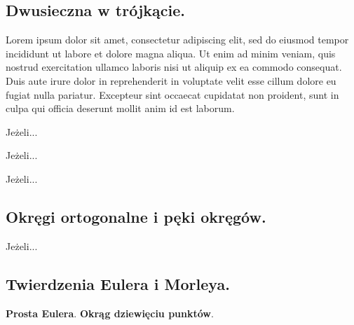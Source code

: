 \documentclass{greaseproof}
\begin{document}
\subsection{Dwusieczna w trójkącie.} Lorem ipsum dolor sit amet, consectetur adipiscing elit, sed do eiusmod tempor incididunt ut labore et dolore magna aliqua. Ut enim ad minim veniam, quis nostrud exercitation ullamco laboris nisi ut aliquip ex ea commodo consequat. Duis aute irure dolor in reprehenderit in voluptate velit esse cillum dolore eu fugiat nulla pariatur. Excepteur sint occaecat cupidatat non proident, sunt in culpa qui officia deserunt mollit anim id est laborum.
\begin{proposition}
	Jeżeli...
\end{proposition}
\begin{theorem}
	Jeżeli...
\end{theorem}
\begin{definition}
	Jeżeli...
\end{definition}

\subsection{Okręgi ortogonalne i pęki okręgów.}
\begin{theorem}[Ponceleta]
	Jeżeli...
\end{theorem}

\subsection{Twierdzenia Eulera i Morleya.}
\textbf{Prosta Eulera}.
\textbf{Okrąg dziewięciu punktów}.



{}


\raggedright
{}
\printindex

\printindex[persons]
\end{document}
